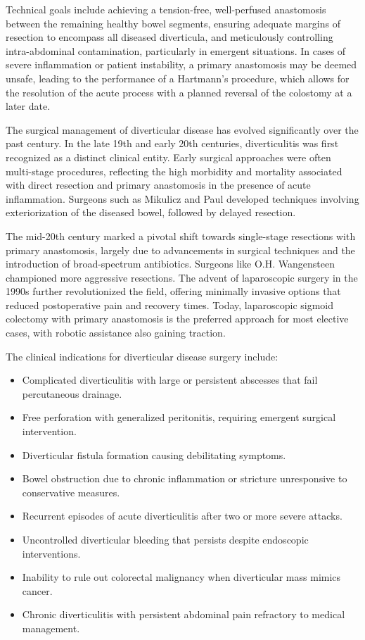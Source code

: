 Technical goals include achieving a tension-free, well-perfused anastomosis between the remaining healthy bowel segments, ensuring adequate margins of resection to encompass all diseased diverticula, and meticulously controlling intra-abdominal contamination, particularly in emergent situations. In cases of severe inflammation or patient instability, a primary anastomosis may be deemed unsafe, leading to the performance of a Hartmann's procedure, which allows for the resolution of the acute process with a planned reversal of the colostomy at a later date.

The surgical management of diverticular disease has evolved significantly over the past century. In the late 19th and early 20th centuries, diverticulitis was first recognized as a distinct clinical entity. Early surgical approaches were often multi-stage procedures, reflecting the high morbidity and mortality associated with direct resection and primary anastomosis in the presence of acute inflammation. Surgeons such as Mikulicz and Paul developed techniques involving exteriorization of the diseased bowel, followed by delayed resection.

The mid-20th century marked a pivotal shift towards single-stage resections with primary anastomosis, largely due to advancements in surgical techniques and the introduction of broad-spectrum antibiotics. Surgeons like O.H. Wangensteen championed more aggressive resections. The advent of laparoscopic surgery in the 1990s further revolutionized the field, offering minimally invasive options that reduced postoperative pain and recovery times. Today, laparoscopic sigmoid colectomy with primary anastomosis is the preferred approach for most elective cases, with robotic assistance also gaining traction.

The clinical indications for diverticular disease surgery include:

\begin{itemize}
  \item Complicated diverticulitis with large or persistent abscesses that fail percutaneous drainage.
  \item Free perforation with generalized peritonitis, requiring emergent surgical intervention.
  \item Diverticular fistula formation causing debilitating symptoms.
  \item Bowel obstruction due to chronic inflammation or stricture unresponsive to conservative measures.
  \item Recurrent episodes of acute diverticulitis after two or more severe attacks.
  \item Uncontrolled diverticular bleeding that persists despite endoscopic interventions.
  \item Inability to rule out colorectal malignancy when diverticular mass mimics cancer.
  \item Chronic diverticulitis with persistent abdominal pain refractory to medical management.
\end{itemize}

